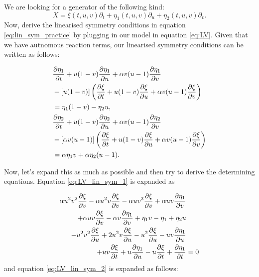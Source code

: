 We are looking for a generator of the following kind:
\begin{equation}
X=\xi(t,u,v)\partial_t+\eta_1(t,u,v)\partial_u+\eta_2(t,u,v)\partial_v.
\end{equation}
Now, derive the linearised symmetry conditions in equation \eqref{eq:lin_sym_practice} by plugging in our model in equation \eqref{eq:LV}. Given that we have autnomous reaction terms, our linearised symmetry conditions can be written as follows:


\begin{align}
    &\pdv{\eta_1}{t}+u(1-v)\pdv{\eta_1}{u}+\alpha v(u-1)\pdv{\eta_1}{v}\nonumber\\
    &-\left[u(1-v)\right]\left(\pdv{\xi}{t}+u(1-v)\pdv{\xi}{u}+\alpha v(u-1)\pdv{\xi}{v}\right)\label{eq:LV_lin_sym_1}\\
    &=\eta_1(1-v)-\eta_2 u,\nonumber\\
    &\pdv{\eta_2}{t}+u(1-v)\pdv{\eta_2}{u}+\alpha v(u-1)\pdv{\eta_2}{v}\nonumber\\
    &-\left[\alpha v(u-1)\right]\left(\pdv{\xi}{t}+u(1-v)\pdv{\xi}{u}+\alpha v(u-1)\pdv{\xi}{v}\right)\label{eq:LV_lin_sym_2}\\
    &=\alpha\eta_1 v+\alpha\eta_2(u-1).\nonumber
\end{align}




Now, let's expand this as much as possible and then try to derive the determining equations. Equation \eqref{eq:LV_lin_sym_1} is expanded as



\begin{align}
  \alpha u^{2} v^{2} \pdv{\xi}{v}  - \alpha u^{2} v \pdv{\xi}{v} - \alpha u v^{2} \pdv{\xi}{v} + \alpha u v \pdv{\eta_1}{v}&\nonumber\\
  + \alpha u v \pdv{\xi}{v}  - \alpha v \pdv{\eta_1}{v}  + \eta_1 v - \eta_1 + \eta_2 u &\nonumber\\
  - u^{2} v^{2} \pdv{\xi}{u}  + 2 u^{2} v \pdv{\xi}{u}  - u^{2} \pdv{\xi}{u}  - u v \pdv{\eta_1}{u}&\nonumber\\
  + u v \pdv{\xi}{t}+ u \pdv{\eta_1}{u}  - u \pdv{\xi}{t}+ \pdv{\eta_1}{t}&=0
  \end{align}
and equation \eqref{eq:LV_lin_sym_2} is expanded as follows: